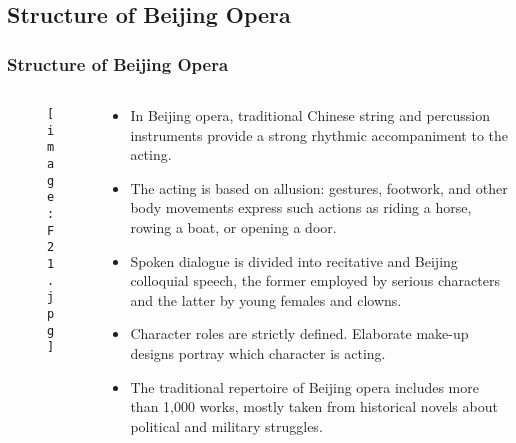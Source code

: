 \documentclass[pdflatex,compress,8pt,
	xcolor={dvipsnames,dvipsnames,svgnames,x11names,table},
	hyperref={	
	breaklinks = true, 
	pdfauthor={Lemenkova Polina}, 
	pdfsubject={Preentation}, 
	pdfcreator={Lemenkova Polina}, 
	pdfproducer={Lemenkova Polina}, 
	colorlinks=true,
	linkcolor=NavyBlue, 
	citecolor=NavyBlue, 
	urlcolor = NavyBlue, 
	breaklinks = true}]{beamer}
\begin{document}
\subsection{Structure of Beijing Opera}
\begin{frame}\frametitle{Structure of Beijing Opera}
	\begin{minipage}[0.4\textheight]{\textwidth}
		\begin{columns}[T]
			\begin{column}{0.5\textwidth}
				\begin{figure}[H]
					\centering
					\texttt{[image: F21.jpg]}
				\end{figure}
			\end{column}
			\begin{column}{0.5\textwidth}
				\begin{itemize}
					\item In Beijing opera, traditional Chinese string and percussion instruments provide a strong rhythmic accompaniment to the acting.
					\item The acting is based on allusion: gestures, footwork, and other body movements express such actions as riding a horse, rowing a boat, or opening a door.
					\item Spoken dialogue is divided into recitative and Beijing colloquial speech, the former employed by serious characters and the latter by young females and clowns.
					\item Character roles are strictly defined. Elaborate make-up designs portray which character is acting.
					\item The traditional repertoire of Beijing opera includes more than 1,000 works, mostly taken from historical novels about political and military struggles.
				\end{itemize}
			\end{column}
		\end{columns}
	\end{minipage}
\end{frame}
\end{document}
